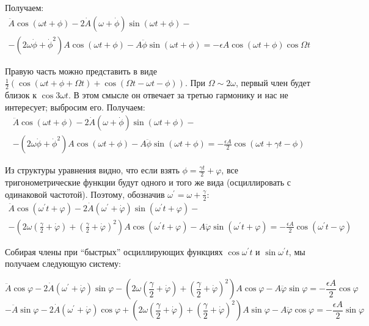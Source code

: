 \documentclass[a4paper,12pt]{article}
\begin{document}
 \noindent
Получаем:
\begin{multline*}
\ddot{A}\cos(\omega t+\phi)-2\dot{A}(\omega+\dot{\phi})\sin(\omega t+\phi)-\\
-\left(2\omega\dot{\phi}+\dot{\phi}^{2}\right)A\cos(\omega t+\phi)-A\ddot{\phi}\sin(\omega t+\phi)=-\epsilon A\cos(\omega t+\phi)\cos\Omega t
\end{multline*}

 \noindent
Правую часть можно представить в виде $\frac{1}{2}\left(\cos\left(\omega t+\phi+\Omega t\right)+\cos\left(\Omega t-\omega t-\phi\right)\right)$.
При $\Omega\sim2\omega$, первый член будет близок к $\cos3\omega t$.
В этом смысле он отвечает за третью гармонику и нас не интересует;
выбросим его. Получаем:
\begin{multline*}
\ddot{A}\cos(\omega t+\phi)-2\dot{A}(\omega+\dot{\phi})\sin(\omega t+\phi)-\\
-(2\omega\dot{\phi}+\dot{\phi}^{2})A\cos(\omega t+\phi)-A\ddot{\phi}\sin(\omega t+\phi)=-\frac{\epsilon A}{2}\cos(\omega t+\gamma t-\phi)
\end{multline*}

 \noindent
Из структуры уравнения видно, что если взять $\phi=\frac{\gamma t}{2}+\varphi$,
все тригонометрические функции будут одного и того же вида (осциллировать
с одинаковой частотой). Поэтому, обозначив $\omega^{\prime}=\omega+\frac{\gamma}{2}$:
\begin{multline*}
\ddot{A}\cos(\omega^{\prime}t+\varphi)-2\dot{A}(\omega^{\prime}+\dot{\varphi})\sin(\omega^{\prime}t+\varphi)-\\
-\left(2\omega\left(\frac{\gamma}{2}+\dot{\varphi}\right)+\left(\frac{\gamma}{2}+\dot{\varphi}\right)^{2}\right)A\cos(\omega^{\prime}t+\varphi)-A\ddot{\varphi}\sin(\omega^{\prime}t+\varphi)=-\frac{\epsilon A}{2}\cos(\omega^{\prime}t-\varphi)
\end{multline*}

 \noindent
Собирая члены при ``быстрых'' осциллирующих функциях $\cos\omega^{\prime}t$
и $\sin\omega^{\prime}t$, мы получаем следующую систему:

\[
\ddot{A}\cos\varphi-2\dot{A}(\omega^{\prime}+\dot{\varphi})\sin\varphi-\left(2\omega\left(\frac{\gamma}{2}+\dot{\varphi}\right)+\left(\frac{\gamma}{2}+\dot{\varphi}\right)^{2}\right)A\cos\varphi-A\ddot{\varphi}\sin\varphi =-\frac{\epsilon A}{2}\cos\varphi
\]
\[
-\ddot{A}\sin\varphi-2\dot{A}(\omega^{\prime}+\dot{\varphi})\cos\varphi+\left(2\omega\left(\frac{\gamma}{2}+\dot{\varphi}\right)+\left(\frac{\gamma}{2}+\dot{\varphi}\right)^{2}\right)A\sin\varphi-A\ddot{\varphi}\cos\varphi =-\frac{\epsilon A}{2}\sin\varphi
\]
\end{document}
